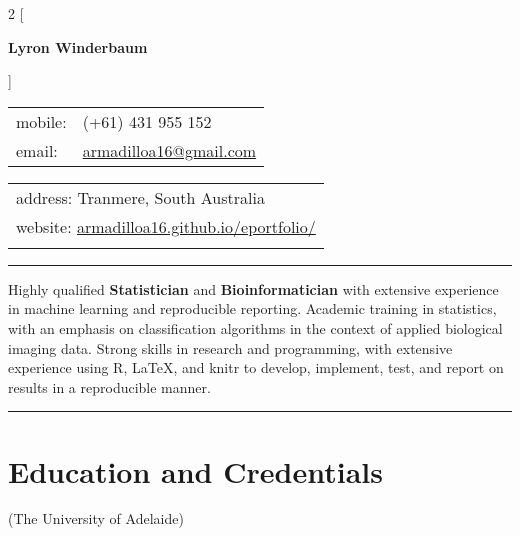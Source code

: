 \documentclass[a4paper,12pt]{report}
\begin{document}
 

\begin{multicols}{2}
[
\begin{center}
{\Large \textbf{Lyron Winderbaum}} \\ \vspace{4mm}
\end{center}
]

\begin{flushleft}
\begin{tabular}{ll}
mobile: & (+61) 431 955 152 \\
email: & \href{mailto:armadilloa16@gmail.com}{armadilloa16@gmail.com} \\
\end{tabular}
\end{flushleft}

\begin{flushright}
\begin{tabular}{l}
address: Tranmere, South Australia \\
website: \href{https://armadilloa16.github.io/eportfolio/}{armadilloa16.github.io/eportfolio/} \\
{}
\end{tabular}
\end{flushright}
\end{multicols}                                  

\hrule
\vspace{0.4cm}

Highly qualified \textbf{Statistician} and \textbf{Bioinformatician} with extensive experience in machine learning and reproducible reporting. Academic training in statistics, with an emphasis on classification algorithms in the context of applied biological imaging data. Strong skills in research and programming, with extensive experience using R, \LaTeX, and knitr to develop, implement, test, and report on results in a reproducible manner.

\vspace{0.4cm}
\hrule

\section*{Education and Credentials}
(The University of Adelaide)
\end{document}
